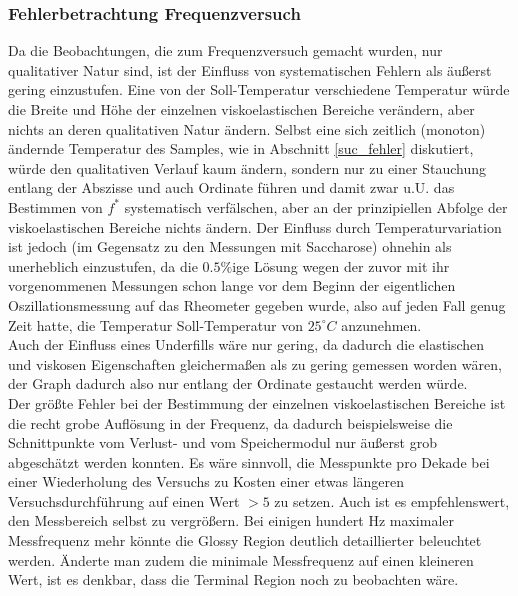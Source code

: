 \documentclass[11pt,a4paper,oneside]{scrartcl}
\begin{document}



\subsubsection{Fehlerbetrachtung Frequenzversuch}
Da die Beobachtungen, die zum Frequenzversuch gemacht wurden, nur qualitativer Natur sind, ist der Einfluss von systematischen Fehlern als äußerst gering einzustufen. Eine von der Soll-Temperatur verschiedene Temperatur würde die Breite und Höhe der einzelnen viskoelastischen Bereiche verändern, aber nichts an deren qualitativen Natur ändern. Selbst eine sich zeitlich (monoton) ändernde Temperatur des Samples, wie in Abschnitt \ref{suc_fehler} diskutiert, würde den qualitativen Verlauf kaum ändern, sondern nur zu einer Stauchung entlang der Abszisse und auch Ordinate führen und damit zwar u.U. das Bestimmen von $f^*$ systematisch verfälschen, aber an der prinzipiellen Abfolge der viskoelastischen Bereiche nichts ändern. Der Einfluss durch Temperaturvariation ist jedoch (im Gegensatz zu den Messungen mit Saccharose) ohnehin als unerheblich einzustufen, da die $0.5\%$ige Lösung wegen der zuvor mit ihr vorgenommenen Messungen schon lange vor dem Beginn der eigentlichen Oszillationsmessung auf das Rheometer gegeben wurde, also auf jeden Fall genug Zeit hatte, die Temperatur Soll-Temperatur von $25^\circ C$ anzunehmen.\\
  Auch der Einfluss eines Underfills wäre nur gering, da dadurch die elastischen und viskosen Eigenschaften gleichermaßen als zu gering gemessen worden wären, der Graph dadurch also nur entlang der Ordinate gestaucht werden würde. \\
Der größte Fehler bei der Bestimmung der einzelnen viskoelastischen Bereiche ist die recht grobe Auflösung in der Frequenz, da dadurch beispielsweise die Schnittpunkte vom Verlust- und vom Speichermodul nur äußerst grob abgeschätzt werden konnten. Es wäre sinnvoll, die Messpunkte pro Dekade bei einer Wiederholung des Versuchs zu Kosten einer etwas längeren Versuchsdurchführung auf einen Wert $>5$ zu setzen. Auch ist es empfehlenswert, den Messbereich selbst zu vergrößern. Bei einigen hundert Hz maximaler Messfrequenz mehr könnte die Glossy Region deutlich detaillierter beleuchtet werden. Änderte man zudem die minimale Messfrequenz auf einen kleineren Wert,  ist es denkbar, dass die Terminal Region noch zu beobachten wäre.\\
\end{document}
